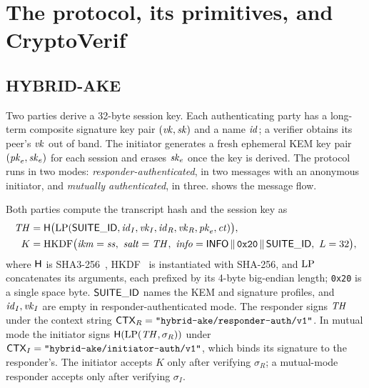 \section{The protocol, its primitives, and CryptoVerif}\label{sec:background}

\subsection{HYBRID-AKE}\label{sec:protocol}

Two parties derive a 32-byte session key. Each authenticating party has a
long-term composite signature key pair $(\mathit{vk},\mathit{sk})$ and a name $\mathit{id}$; a
verifier obtains its peer's $\mathit{vk}$ out of band. The initiator generates a
fresh ephemeral KEM key pair $(\mathit{pk}_e,\mathit{sk}_e)$ for each session and erases
$\mathit{sk}_e$ once the key is derived. The protocol runs in two modes:
\emph{responder-authenticated}, in two messages with an anonymous initiator,
and \emph{mutually authenticated}, in three.  shows the
message flow.

Both parties compute the transcript hash and the session key as
\begin{align*}
  \mathit{TH} &= \mathsf{H}\bigl(\mathrm{LP}(\mathsf{SUITE\_ID}, \mathit{id}_I, \mathit{vk}_I, \mathit{id}_R, \mathit{vk}_R, \mathit{pk}_e, \mathit{ct})\bigr),\\
  K   &= \mathrm{HKDF}\bigl(\mathit{ikm} = \mathit{ss},\ \mathit{salt} = \mathit{TH},\
         \mathit{info} = \mathsf{INFO} \,\|\, \texttt{0x20} \,\|\, \mathsf{SUITE\_ID},\ L = 32\bigr),
\end{align*}
where $\mathsf{H}$ is SHA3-256~\cite{FIPS202}, HKDF~\cite{RFC5869,Kra10} is
instantiated with SHA-256, and $\mathrm{LP}$ concatenates its arguments, each
prefixed by its 4-byte big-endian length; \texttt{0x20} is a single space
byte. $\mathsf{SUITE\_ID}$ names the KEM and
signature profiles, and $\mathit{id}_I,\mathit{vk}_I$ are empty in responder-authenticated
mode. The responder signs $\mathit{TH}$ under the context string
$\mathsf{CTX}_R = \text{\texttt{"hybrid-ake/responder-auth/v1"}}$. In mutual mode the
initiator signs $\mathsf{H}(\mathrm{LP}(\mathit{TH}, \sigma_R))$ under
$\mathsf{CTX}_I = \text{\texttt{"hybrid-ake/initiator-auth/v1"}}$, which binds its
signature to the responder's. The initiator accepts $K$ only after verifying
$\sigma_R$; a mutual-mode responder accepts only after verifying $\sigma_I$.

